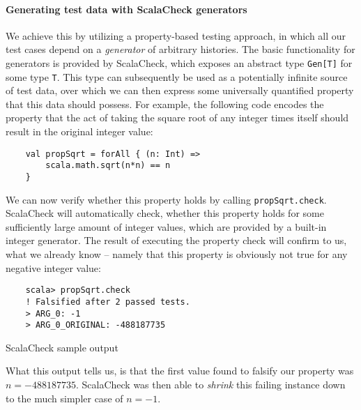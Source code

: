 \paragraph{Generating test data with ScalaCheck generators}
We achieve this by utilizing a property-based testing approach, in which all our test cases depend on a \emph{generator} of arbitrary histories. The basic functionality for generators is provided by ScalaCheck, which exposes an abstract type \texttt{Gen[T]} for some type \texttt{T}. This type can subsequently be used as a potentially infinite source of test data, over which we can then express some universally quantified property that this data should possess.
For example, the following code encodes the property that the act of taking the square root of any integer times itself should result in the original integer value: 
\begin{verbatim}
    val propSqrt = forAll { (n: Int) => 
        scala.math.sqrt(n*n) == n 
    }
\end{verbatim}

We can now verify whether this property holds by calling \texttt{propSqrt.check}. 
ScalaCheck will automatically check, whether this property holds for some sufficiently large amount of integer values, which are provided by a built-in integer generator. The result of executing the property check will confirm to us, what we already know -- namely that this property is obviously not true for any negative integer value: 
\begin{code}
    \begin{verbatim}
    scala> propSqrt.check
    ! Falsified after 2 passed tests.
    > ARG_0: -1
    > ARG_0_ORIGINAL: -488187735
    \end{verbatim} 
    \caption{ScalaCheck sample output}
\end{code}

What this output tells us, is that the first value found to falsify our property was \(n=-488187735\). ScalaCheck was then able to \emph{shrink} this failing instance down to the much simpler case of \(n=-1\).

